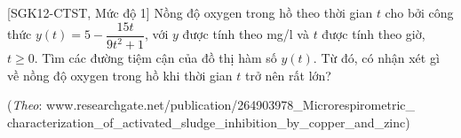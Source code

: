 \begin{bt}%
[SGK12-CTST, Mức độ 1]%
	Nồng độ oxygen trong hồ theo thời gian $t$ cho bởi công thức $y(t)=5-\dfrac{15t}{9t^{2}+1}$, với $y$ được tính theo mg/l và $t$ được tính theo giờ, $t \geq 0$. Tìm các đường tiệm cận của đồ thị hàm số $y(t)$. Từ đó, có nhận xét gì về nồng độ oxygen trong hồ khi thời gian $t$ trở nên rất lớn?
	\begin{flushright}
		(\textit{Theo}: www.researchgate.net/publication/264903978\_Microrespirometric\_\\
		characterization\_of\_activated\_sludge\_inhibition\_by\_copper\_and\_zinc)
	\end{flushright}
\end{bt}

